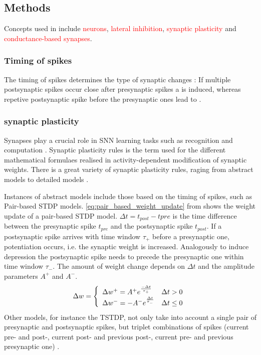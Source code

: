 \subsection{Methods}
\label{subsec:methods}

Concepts used in \cite{SNN} include \textcolor{red}{ neurons}, \textcolor{red}{lateral inhibition}, \textcolor{red}{synaptic plasticity} and \textcolor{red}{conductance-based synapses}.

\subsubsection{Timing of spikes}
The timing of spikes determines the type of synaptic changes \cite{LTP_D_bio}:
If multiple postsynaptic spikes occur close after presynaptic spikes a  is induced, 
whereas repetive postsynaptic spike before the presynaptic ones lead to .


\subsubsection{synaptic plasticity}
Synapses play a crucial role in \ac{SNN} learning tasks such as recognition and computation \cite{Synaptic_plasticity}.
Synaptic plasticity rules is the term used for the different mathematical formulaes realised in activity-dependent modification of synaptic weights.
There is a great variety of synaptic plasticity rules, raging from abstract models to detailed models \cite{Synaptic_plasticity}.

Instances of abstract models include those based on the timing of spikes, such as Pair-based \ac{STDP} models.
\autoref{eq:pair_based_weight_update} from \cite{Synaptic_plasticity} shows the weight update of a pair-based \ac{STDP} model.
$\Delta t = t_{post} - t{pre}$ is the time difference between the presynaptic spike $t_{pre}$ and the postsynaptic spike $t_{post}$.
If a postsynaptic spike arrives with time window $\tau_+$ before a presynaptic one, potentiation occurs, i.e. the synaptic weight is increased. 
Analogously to induce depression the postsynaptic spike needs to precede the presynaptic one within time window $\tau_-$.
The amount of weight change depends on $\Delta t $ and the amplitude parameters $A^+$ and $A^-$.
%
\begin{equation}
    \centering
    \label{eq:pair_based_weight_update}
    \Delta w = \left\{
        \begin{array}{ll}
        \Delta w^+ = A^+ e^{\frac{-\Delta t}{\tau_+}} & \Delta t > 0 \\
        \Delta w^- = -A^- e^{\frac{\Delta t}{\tau_-}} & \Delta t \le 0 \\
        \end{array}
        \right.
\end{equation}
%
Other models, for instance the \ac{TSTDP}, not only take into account a single pair of presynaptic and postsynaptic spikes, 
but triplet combinations of spikes 
(current pre- and post-, current post- and previous post-, current pre- and previous presynaptic one) \cite{Synaptic_plasticity}.

